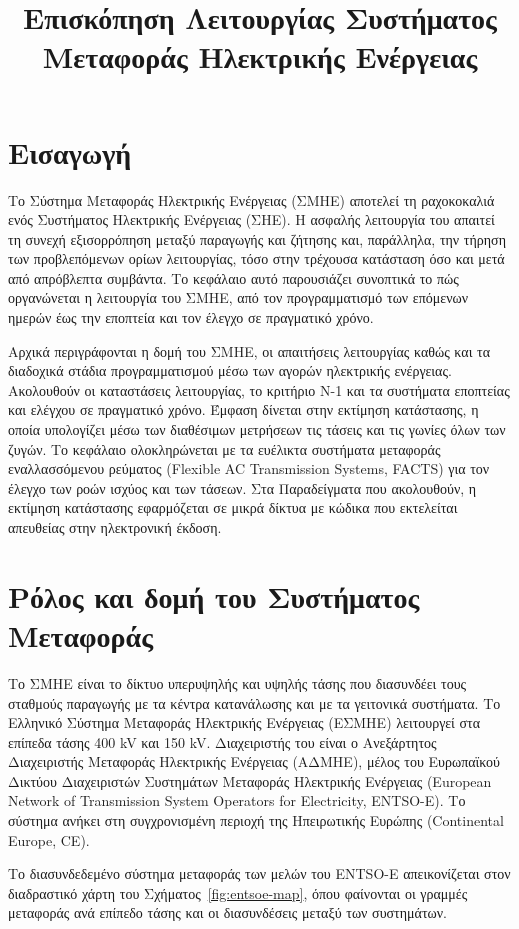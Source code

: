 \title{Επισκόπηση Λειτουργίας Συστήματος Μεταφοράς Ηλεκτρικής Ενέργειας}

\section{Εισαγωγή}
\label{kef-01-theoria}

Το Σύστημα Μεταφοράς Ηλεκτρικής Ενέργειας (ΣΜΗΕ) αποτελεί τη ραχοκοκαλιά ενός Συστήματος
Ηλεκτρικής Ενέργειας (ΣΗΕ). Η ασφαλής λειτουργία του απαιτεί τη συνεχή εξισορρόπηση μεταξύ
παραγωγής και ζήτησης και, παράλληλα, την τήρηση των προβλεπόμενων ορίων λειτουργίας, τόσο στην τρέχουσα κατάσταση όσο
και μετά από απρόβλεπτα συμβάντα. Το κεφάλαιο αυτό παρουσιάζει συνοπτικά το πώς οργανώνεται η
λειτουργία του ΣΜΗΕ, από τον προγραμματισμό των επόμενων ημερών έως την εποπτεία και τον
έλεγχο σε πραγματικό χρόνο.

Αρχικά περιγράφονται η δομή του ΣΜΗΕ, οι απαιτήσεις λειτουργίας καθώς και τα
διαδοχικά στάδια προγραμματισμού μέσω των αγορών ηλεκτρικής ενέργειας. Ακολουθούν οι καταστάσεις λειτουργίας, το κριτήριο N-1 και τα συστήματα εποπτείας και ελέγχου σε πραγματικό χρόνο. Έμφαση δίνεται στην εκτίμηση κατάστασης, η οποία υπολογίζει μέσω των διαθέσιμων μετρήσεων τις τάσεις και τις γωνίες όλων των ζυγών. Το κεφάλαιο ολοκληρώνεται με τα ευέλικτα συστήματα μεταφοράς
εναλλασσόμενου ρεύματος (Flexible AC Transmission Systems, FACTS) για τον έλεγχο των ροών
ισχύος και των τάσεων. Στα Παραδείγματα που ακολουθούν, η εκτίμηση κατάστασης εφαρμόζεται σε
μικρά δίκτυα με κώδικα που εκτελείται απευθείας στην ηλεκτρονική έκδοση.

\section{Ρόλος και δομή του Συστήματος Μεταφοράς}

Το ΣΜΗΕ είναι το δίκτυο υπερυψηλής και υψηλής τάσης που διασυνδέει τους σταθμούς παραγωγής με τα κέντρα κατανάλωσης και με τα γειτονικά
συστήματα. Το Ελληνικό Σύστημα Μεταφοράς Ηλεκτρικής Ενέργειας (ΕΣΜΗΕ) λειτουργεί στα επίπεδα
τάσης 400 kV και 150 kV. Διαχειριστής του είναι ο Ανεξάρτητος Διαχειριστής Μεταφοράς
Ηλεκτρικής Ενέργειας (ΑΔΜΗΕ), μέλος του Ευρωπαϊκού Δικτύου Διαχειριστών Συστημάτων Μεταφοράς
Ηλεκτρικής Ενέργειας (European Network of Transmission System
Operators for Electricity, ENTSO-E). Το σύστημα ανήκει στη
συγχρονισμένη περιοχή της Ηπειρωτικής Ευρώπης (Continental Europe, CE).

Το διασυνδεδεμένο σύστημα μεταφοράς των μελών του ENTSO-E απεικονίζεται στον διαδραστικό
χάρτη του Σχήματος~\ref{fig:entsoe-map}, όπου φαίνονται οι γραμμές μεταφοράς ανά επίπεδο
τάσης και οι διασυνδέσεις μεταξύ των συστημάτων.

